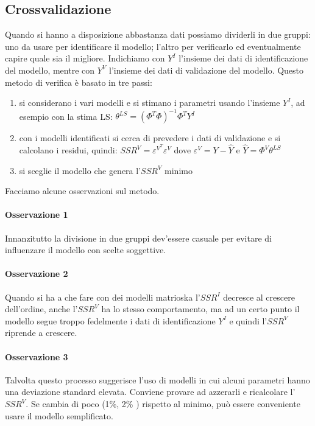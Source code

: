 \subsection{Crossvalidazione}
Quando si hanno a disposizione abbastanza dati possiamo dividerli in due gruppi: uno da usare per identificare il modello; l'altro per verificarlo ed eventualmente capire quale sia il migliore. Indichiamo con $Y^I$ l'insieme dei dati di identificazione del modello, mentre con $Y^V$ l'insieme dei dati di validazione del modello. Questo metodo di verifica è basato in tre passi:

\begin{enumerate}
  \item si considerano i vari modelli e si stimano i parametri usando l'insieme $Y^I$, ad esempio con la stima LS: $\theta^{LS}=(\Phi^T\Phi)^{-1}\Phi^TY^I$
  \item con i modelli identificati si cerca di prevedere i dati di validazione e si calcolano i residui, quindi: $SSR^V=\varepsilon^{V^T}\varepsilon^V$ dove $\varepsilon^V=Y-\hat{Y}$ e $\hat{Y}=\Phi^V\theta^{LS}$
  \item si sceglie il modello che genera l'$SSR^V$ minimo
\end{enumerate}

Facciamo alcune osservazioni sul metodo. 
\paragraph{Osservazione 1} Innanzitutto la divisione in due gruppi dev'essere casuale per evitare di influenzare il modello con scelte soggettive.
\paragraph{Osservazione 2} Quando si ha a che fare con dei modelli matrioska l'$SSR^I$ decresce al crescere dell'ordine, anche l'$SSR^V$ ha lo stesso comportamento, ma ad un certo punto il modello segue troppo fedelmente i dati di identificazione $Y^I$ e quindi l'$SSR^V$ riprende a crescere.
\paragraph{Osservazione 3} Talvolta questo processo suggerisce l'uso di modelli in cui alcuni parametri hanno una deviazione standard elevata. Conviene provare ad azzerarli e ricalcolare l'$SSR^V$. Se cambia di poco (1\%, 2\% ) rispetto al minimo, può essere conveniente usare il modello semplificato.
